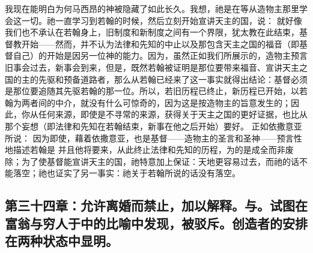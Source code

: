 我现在能明白为何马西昂的神被隐藏了如此长久。我想，祂是在等从造物主那里学会这一切。祂一直学习到若翰的时候，然后立刻开始宣讲天主的国，说：  就好像我们也不承认在若翰身上，旧制度和新制度之间有一个界限，犹太教在此结束，基督教开始——然而，并不认为法律和先知的中止以及那包含天主之国的福音（即基督自己）的开始是因另一位神的能力。因为，虽然正如我们所展示的，造物主预言旧事会过去，新事会到来，但是，既然若翰被证明是那位要带来福音、宣讲天主之国的主的先驱和预备道路者，那么从若翰已经来了这一事实就得出结论：基督必须是那位要追随其先驱若翰的那一位。所以，若旧历程已终止，新历程已开始，以若翰为两者间的中介，就没有什么可惊奇的，因为这是按造物主的旨意发生的；因此，你从任何来源，即使是不寻常的来源，获得关于天主之国的更好证据，也比从那个妄想（即法律和先知在若翰结束，新事在他之后开始）要好。 正如依撒意亚所说：  因为即使，藉着依撒意亚，也是基督——造物主的圣言和圣神——预言性地描述若翰是  并且他将要来，从此终止法律和先知的历程，为的是成全而非废除；为了使基督能宣讲天主的国，祂特意加上保证：天地更容易过去，而祂的话不能落空；祂也证实了另一事实：祂关于若翰所说的话没有落空。\par


\subsection{第三十四章：允许离婚而禁止，加以解释。与。试图在富翁与穷人于中的比喻中发现，被驳斥。创造者的安排在两种状态中显明。}

